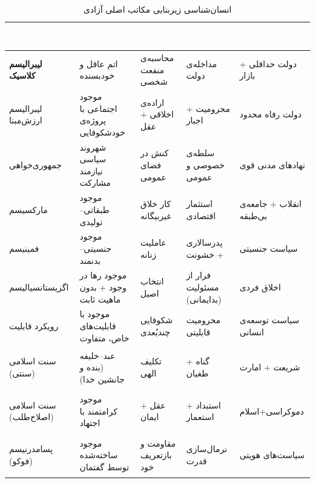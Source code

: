 \begin{table}[h!]
\centering
\caption{انسان‌شناسی زیربنایی مکاتب اصلی آزادی}
\label{tab:anthropology}
\renewcommand{\arraystretch}{1.8}
\setlength{\tabcolsep}{5pt}

\begin{tabularx}{\textwidth}{|>{\bfseries\color{PrimaryMid}}p{2.4cm}
  |>{\raggedright}X|>{\raggedright}X|>{\raggedright}X
  |>{\raggedright\arraybackslash}X|}

\hline
\rowcolor{PrimaryDeep}
\textcolor{white}{\textbf{مکتب}} &
\textcolor{white}{\textbf{تصویر انسان}} &
\textcolor{white}{\textbf{توانایی اصلی}} &
\textcolor{white}{\textbf{خطر اصلی برای انسان}} &
\textcolor{white}{\textbf{نتیجه‌ی سیاسی}} \\
\hline

\rowcolor{BgCool}
لیبرالیسم کلاسیک &
اتم عاقل و خودبسنده &
محاسبه‌ی منفعت شخصی &
مداخله‌ی دولت &
دولت حداقلی + بازار \\
\hline

\rowcolor{white}
لیبرالیسم ارزش‌مبنا &
موجود اجتماعی با پروژه‌ی خودشکوفایی &
اراده‌ی اخلاقی + عقل &
محرومیت + اجبار &
دولت رفاه محدود \\
\hline

\rowcolor{BgCool}
جمهوری‌خواهی &
شهروند سیاسی نیازمند مشارکت &
کنش در فضای عمومی &
سلطه‌ی خصوصی و عمومی &
نهادهای مدنی قوی \\
\hline

\rowcolor{white}
مارکسیسم &
موجود طبقاتی–تولیدی &
کار خلاق غیربیگانه &
استثمار اقتصادی &
انقلاب + جامعه‌ی بی‌طبقه \\
\hline

\rowcolor{BgCool}
فمینیسم &
موجود جنسیتی–بدنمند &
عاملیت زنانه &
پدرسالاری + خشونت &
سیاست جنسیتی \\
\hline

\rowcolor{white}
اگزیستانسیالیسم &
موجود رها در وجود + بدون ماهیت ثابت &
انتخاب اصیل &
فرار از مسئولیت (بدایمانی) &
اخلاق فردی \\
\hline

\rowcolor{BgCool}
رویکرد قابلیت &
موجود با قابلیت‌های خاص، متفاوت &
شکوفایی چندبُعدی &
محرومیت قابلیتی &
سیاست توسعه‌ی انسانی \\
\hline

\rowcolor{white}
سنت اسلامی (سنتی) &
عبد–خلیفه (بنده و جانشین خدا) &
تکلیف الهی &
گناه + طغیان &
شریعت + امارت \\
\hline

\rowcolor{BgCool}
سنت اسلامی (اصلاح‌طلب) &
موجود کرامتمند با اجتهاد &
عقل + ایمان &
استبداد + استعمار &
دموکراسی+اسلام \\
\hline

\rowcolor{white}
پسامدرنیسم (فوکو) &
موجود ساخته‌شده توسط گفتمان &
مقاومت و بازتعریف خود &
نرمال‌سازی قدرت &
سیاست‌های هویتی \\
\hline

\end{tabularx}
\end{table}

